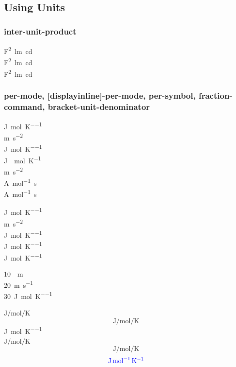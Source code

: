 \documentclass{article}
\begin{document}

\subsection{Using Units}
\subsubsection{inter-unit-product}
\unit{\farad\squared\lumen\candela} \\
\unit[inter-unit-product = \ensuremath{{}\cdot{}}]{\farad\squared\lumen\candela}\\
\unit[color=blue,inter-unit-product = \ensuremath{{}\cdot{}}]{\farad\squared\lumen\candela}

\subsubsection{per-mode, [display\textbar inline]-per-mode, per-symbol, fraction-command, bracket-unit-denominator}
\unit{\joule\per\mole\per\kelvin} \\
\unit{\metre\per\second\squared} \\
\unit[per-mode=fraction]{\joule\per\mole\per\kelvin} \\
\unit[per-mode=fraction]{\joule{}\mole\per\kelvin} \\
\unit[per-mode=fraction]{\metre\per\second\squared}\\
\unit{\ampere\per\mole\second} \\
\unit[per-mode = power-positive-first]{\ampere\per\mole\second}

{
%
\unit{\joule\per\mole\per\kelvin} \\
\unit{\metre\per\second\squared} \\
\unit[per-symbol = \ \text{div}\ ]{\joule\per\mole\per\kelvin} \\
\unit[bracket-unit-denominator = false]{\joule\per\mole\per\kelvin}\\
}
\unit[per-mode=repeated-symbol]{\joule\per\mole\per\kelvin}

{
\qty{10}{\per\metre} \\
\qty{20}{\metre\per\second} \\
\qty{30}{\joule\per\mole\per\kelvin}
}

{
%
\( \unit{\joule\per\mole\per\kelvin} \)
\[ \unit{\joule\per\mole\per\kelvin} \]
\unit{\joule\per\mole\per\kelvin} \\
\(
\displaystyle
\unit{\joule\per\mole\per\kelvin}
\)
\[
\textstyle
\unit{\joule\per\mole\per\kelvin}
\]
\[
\textstyle
\unit[color=blue]{\joule\per\mole\per\kelvin}
\]
}
\end{document}
